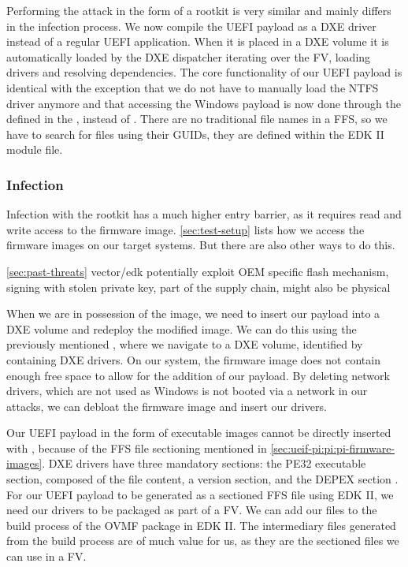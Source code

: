 Performing the attack in the form of a rootkit is very similar and mainly differs in the infection process.
We now compile the \ac{UEFI} payload as a \ac{DXE} driver instead of a regular \ac{UEFI} application.
When it is placed in a \ac{DXE} volume it is automatically loaded by the \ac{DXE} dispatcher iterating over the \ac{FV}, loading drivers and resolving dependencies.
The core functionality of our \ac{UEFI} payload is identical with the exception that we do not have to manually load the \ac{NTFS} driver anymore and that accessing the Windows payload is now done through the  defined in the \cite[Section 3.4.1]{pi-spec}, instead of .
There are no traditional file names in a \ac{FFS}, so we have to search for files using their \acp{GUID}, they are defined within the \ac{EDK} II module file.

\subsubsection{Infection}

Infection with the rootkit has a much higher entry barrier, as it requires read and write access to the firmware image.
\autoref{sec:test-setup} lists how we access the firmware images on our target systems.
But there are also other ways to do this.

\autoref{sec:past-threats} vector\-/edk potentially exploit \ac{OEM} specific flash mechanism, signing with stolen private key, part of the supply chain, might also be physical 

When we are in possession of the image, we need to insert our payload into a \ac{DXE} volume and redeploy the modified image.
We can do this using the previously mentioned , where we navigate to a \ac{DXE} volume, identified by containing \ac{DXE} drivers.
On our  system, the firmware image does not contain enough free space to allow for the addition of our payload.
By deleting network drivers, which are not used as Windows is not booted via a network in our attacks, we can debloat the firmware image and insert our drivers.

Our \ac{UEFI} payload in the form of  executable images cannot be directly inserted with , because of the \ac{FFS} file sectioning mentioned in \autoref{sec:ueif-pi:pi:pi-firmware-images}.
\ac{DXE} drivers have three mandatory sections: the \ac{PE32} executable section, composed of the  file content, a version section, and the \ac{DEPEX} section \cite[Vol. 3, 2.1.4.1.4]{pi-spec}.
For our \ac{UEFI} payload to be generated as a sectioned \ac{FFS} file using \ac{EDK} II, we need our drivers to be packaged as part of a \ac{FV}.
We can add our files to the build process of the \ac{OVMF} package in \ac{EDK} II.
The intermediary  files generated from the build process are of much value for us, as they are the sectioned files we can use in a \ac{FV}.

